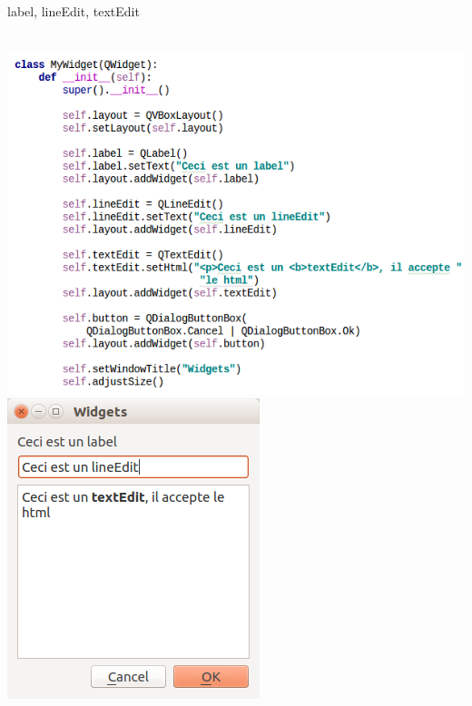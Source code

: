 \documentclass[9pt, french, brown]{beamer}
\newcommand{\mytitle}[1]{{\color{brown}#1 \\~\\}}
\begin{document}
\begin{frame}{\secname}{\subsecname}
\mytitle{label, lineEdit, textEdit}
\begin{center}\includegraphics[scale=0.3]{img/widget7_1}\includegraphics[scale=0.3]{img/widget7_1_fig}\end{center}
\end{frame}
\end{document}
